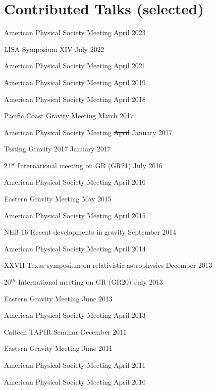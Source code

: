 \section{\sc Contributed Talks (selected)}
\begin{etaremune}
\item
  American Physical Society Meeting
  \hfill{}
  April 2023
\item
  LISA Symposium XIV
  \hfill{}
  July 2022
\item
  American Physical Society Meeting
  \hfill{}
  April 2021
\item
  American Physical Society Meeting
  \hfill{}
  April 2019
\item
  American Physical Society Meeting
  \hfill{}
  April 2018
\item
  Pacific Coast Gravity Meeting
  \hfill{}
  March 2017
\item
  American Physical Society Meeting
  \hfill{}
  \sout{April} January 2017
\item
  Testing Gravity 2017
  \hfill{}
  January 2017
\item
  21$^{st}$ International meeting on GR (GR21)
  \hfill{}
  July 2016
\item
  American Physical Society Meeting
  \hfill{}
  April 2016
\item
  Eastern Gravity Meeting
  \hfill{}
  May 2015
\item
  American Physical Society Meeting
  \hfill{}
  April 2015
\item
  NEB 16 Recent developments in gravity
  \hfill{}
  September 2014
\item
  American Physical Society Meeting
  \hfill{}
  April 2014
\item
  XXVII Texas symposium on relativistic astrophysics
  \hfill{}
  December 2013
\item
  20$^{th}$ International meeting on GR (GR20)
  \hfill{}
  July 2013
\item
  Eastern Gravity Meeting
  \hfill{}
  June 2013
\item
  American Physical Society Meeting
  \hfill{}
  April 2013
\item
  Caltech TAPIR Seminar
  \hfill{}
  December 2011
\item
  Eastern Gravity Meeting
  \hfill{}
  June 2011
\item
  American Physical Society Meeting
  \hfill{}
  April 2011
\item
  American Physical Society Meeting
  \hfill{}
  April 2010
\end{etaremune}


